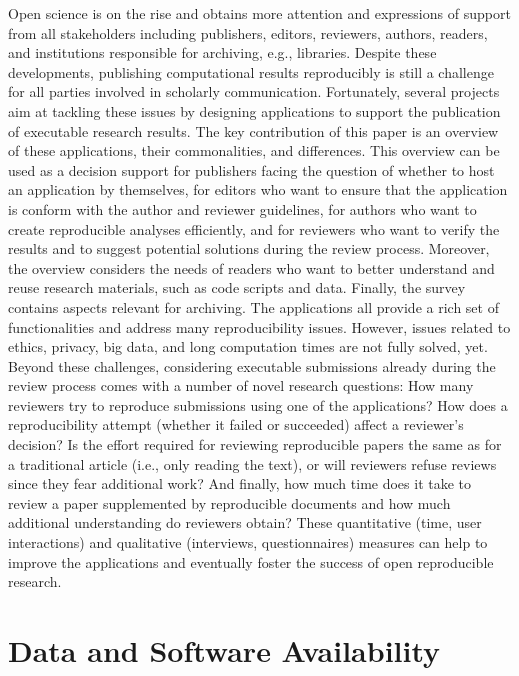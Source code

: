 \documentclass[onecolumn]{article}
\begin{document}
Open science is on the rise and obtains more attention and expressions
of support from all stakeholders including publishers, editors,
reviewers, authors, readers, and institutions responsible for archiving,
e.g., libraries. Despite these developments, publishing computational
results reproducibly is still a challenge for all parties involved in
scholarly communication. Fortunately, several projects aim at tackling
these issues by designing applications to support the publication of
executable research results. The key contribution of this paper is an
overview of these applications, their commonalities, and differences.
This overview can be used as a decision support for publishers facing
the question of whether to host an application by themselves, for
editors who want to ensure that the application is conform with the
author and reviewer guidelines, for authors who want to create
reproducible analyses efficiently, and for reviewers who want to verify
the results and to suggest potential solutions during the review
process. Moreover, the overview considers the needs of readers who want
to better understand and reuse research materials, such as code scripts
and data. Finally, the survey contains aspects relevant for archiving.
The applications all provide a rich set of functionalities and address
many reproducibility issues. However, issues related to ethics, privacy,
big data, and long computation times are not fully solved, yet. Beyond
these challenges, considering executable submissions already during the
review process comes with a number of novel research questions: How many
reviewers try to reproduce submissions using one of the applications?
How does a reproducibility attempt (whether it failed or succeeded)
affect a reviewer's decision? Is the effort required for reviewing
reproducible papers the same as for a traditional article (i.e., only
reading the text), or will reviewers refuse reviews since they fear
additional work? And finally, how much time does it take to review a
paper supplemented by reproducible documents and how much additional
understanding do reviewers obtain? These quantitative (time, user
interactions) and qualitative (interviews, questionnaires) measures can
help to improve the applications and eventually foster the success of
open reproducible research.

\hypertarget{data-and-software-availability}{%
\section{Data and Software
Availability}\label{data-and-software-availability}}
\end{document}
